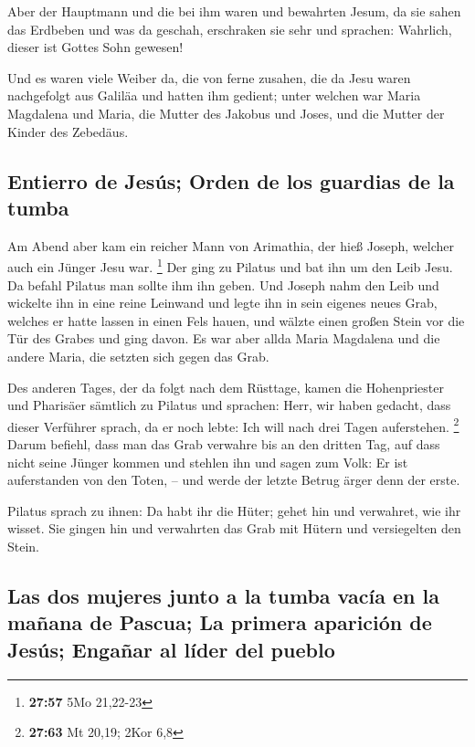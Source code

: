 Aber der Hauptmann und die bei ihm waren und bewahrten
Jesum, da sie sahen das Erdbeben und was da geschah, erschraken sie sehr
und sprachen: Wahrlich, dieser ist Gottes Sohn gewesen!

 Und es waren viele Weiber da, die von ferne zusahen, die
da Jesu waren nachgefolgt aus Galiläa und hatten ihm gedient;
 unter welchen war Maria Magdalena und Maria, die Mutter
des Jakobus und Joses, und die Mutter der Kinder des Zebedäus.

\hypertarget{entierro-de-jesuxfas-orden-de-los-guardias-de-la-tumba}{%
\subsection{Entierro de Jesús; Orden de los guardias de la
tumba}\label{entierro-de-jesuxfas-orden-de-los-guardias-de-la-tumba}}

 Am Abend aber kam ein reicher Mann von Arimathia, der
hieß Joseph, welcher auch ein Jünger Jesu war. \footnote{\textbf{27:57}
  5Mo 21,22-23}  Der ging zu Pilatus und bat ihn um den
Leib Jesu. Da befahl Pilatus man sollte ihm ihn geben. 
Und Joseph nahm den Leib und wickelte ihn in eine reine Leinwand
 und legte ihn in sein eigenes neues Grab, welches er
hatte lassen in einen Fels hauen, und wälzte einen großen Stein vor die
Tür des Grabes und ging davon.  Es war aber allda Maria
Magdalena und die andere Maria, die setzten sich gegen das Grab.

 Des anderen Tages, der da folgt nach dem Rüsttage, kamen
die Hohenpriester und Pharisäer sämtlich zu Pilatus  und
sprachen: Herr, wir haben gedacht, dass dieser Verführer sprach, da er
noch lebte: Ich will nach drei Tagen auferstehen. \footnote{\textbf{27:63}
  Mt 20,19; 2Kor 6,8}  Darum befiehl, dass man das Grab
verwahre bis an den dritten Tag, auf dass nicht seine Jünger kommen und
stehlen ihn und sagen zum Volk: Er ist auferstanden von den Toten, --
und werde der letzte Betrug ärger denn der erste.

 Pilatus sprach zu ihnen: Da habt ihr die Hüter; gehet
hin und verwahret, wie ihr wisset.  Sie gingen hin und
verwahrten das Grab mit Hütern und versiegelten den Stein.

\hypertarget{las-dos-mujeres-junto-a-la-tumba-vacuxeda-en-la-mauxf1ana-de-pascua-la-primera-apariciuxf3n-de-jesuxfas-engauxf1ar-al-luxedder-del-pueblo}{%
\subsection{Las dos mujeres junto a la tumba vacía en la mañana de
Pascua; La primera aparición de Jesús; Engañar al líder del
pueblo}\label{las-dos-mujeres-junto-a-la-tumba-vacuxeda-en-la-mauxf1ana-de-pascua-la-primera-apariciuxf3n-de-jesuxfas-engauxf1ar-al-luxedder-del-pueblo}}

